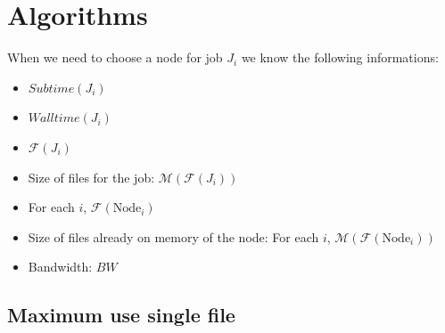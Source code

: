 \documentclass[a4paper]{article}
\newcommand{\Node}[1]{\ensuremath{\mathrm{Node}_{#1}}\xspace}
\newcommand{\inputs}{\ensuremath{\mathcal{F}}\xspace}
\newcommand{\memory}{\ensuremath{\mathcal{M}}\xspace}
\newcommand{\bandwidth}{\mathit{BW}\xspace}
\newcommand{\submissiontime}{\mathit{Subtime}\xspace}
\newcommand{\walltime}{\mathit{Walltime}\xspace}
\begin{document}


\section{Algorithms}

When we need to choose a node for job $J_i$ we know the following informations:
\begin{itemize}
	\item $\submissiontime(J_i)$
	\item $\walltime(J_i)$
	\item $\inputs(J_i)$
	\item Size of files for the job: $\memory(\inputs(J_i))$
	\item For each $i$, $\inputs(\Node{i})$
	\item Size of files already on memory of the node: For each $i$, $\memory(\inputs(\Node{i}))$
	\item Bandwidth: $\bandwidth$
\end{itemize}

\subsection{Maximum use single file}
\end{document}
